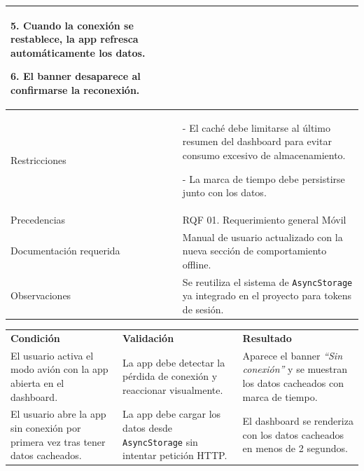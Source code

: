 \begin{tabular}{|p{4.5cm}|p{11cm}|}
5. Cuando la conexión se restablece, la app refresca automáticamente los datos. \par
6. El banner desaparece al confirmarse la reconexión. \\
\hline
Restricciones &
- El caché debe limitarse al último resumen del dashboard para evitar consumo excesivo de almacenamiento. \par
- La marca de tiempo debe persistirse junto con los datos. \\
\hline
Precedencias & RQF 01. Requerimiento general Móvil \\ \hline
Documentación requerida & Manual de usuario actualizado con la nueva sección de comportamiento offline. \\ \hline
Observaciones & Se reutiliza el sistema de \texttt{AsyncStorage} ya integrado en el proyecto para tokens de sesión. \\ \hline
\end{tabular}

\vspace{0.3cm}

\noindent
\begin{tabular}{|p{5.1cm}|p{5.1cm}|p{5.1cm}|}
\hline
\rowcolor{secVerde}\multicolumn{3}{|l|}{\color{white}\textbf{4. CONDICIONES DE PRUEBA}} \\
\hline
\rowcolor{cellGris}\textbf{Condición} & \textbf{Validación} & \textbf{Resultado} \\
\hline
El usuario activa el modo avión con la app abierta en el dashboard. &
La app debe detectar la pérdida de conexión y reaccionar visualmente. &
Aparece el banner \textit{``Sin conexión''} y se muestran los datos cacheados con marca de tiempo. \\
\hline
El usuario abre la app sin conexión por primera vez tras tener datos cacheados. &
La app debe cargar los datos desde \texttt{AsyncStorage} sin intentar petición HTTP. &
El dashboard se renderiza con los datos cacheados en menos de 2 segundos. \\
\hline
\end{tabular}

